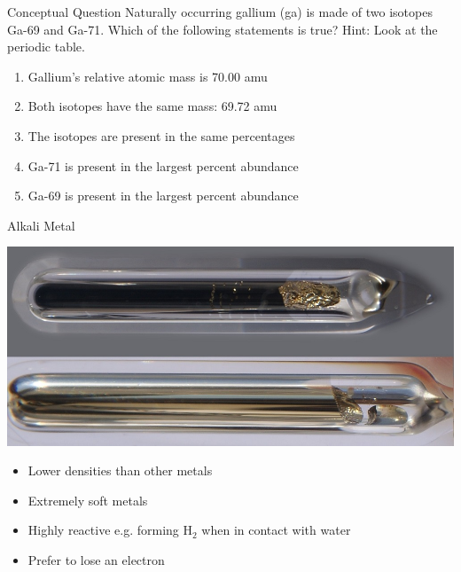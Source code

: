 \documentclass[11pt]{beamer}
\begin{document}
\begin{frame}{Conceptual Question}
  Naturally occurring gallium (ga) is made of two isotopes
  Ga-69 and Ga-71. Which of the following statements is true?
  Hint: Look at the periodic table.
  
  \begin{enumerate}
  \item Gallium's relative atomic mass is 70.00 amu
  \item Both isotopes have the same mass: 69.72 amu
  \item The isotopes are present in the same percentages
  \item Ga-71 is present in the largest percent abundance
  \item Ga-69 is present in the largest percent abundance
  \end{enumerate}
\end{frame}

\begin{frame}{Alkali Metal}
  \begin{center}
    \includegraphics[scale=0.2]{alkali_metal}
  \end{center}
  
  \begin{itemize}
  \item Lower densities than other metals
  \item Extremely soft metals
  \item Highly reactive e.g. forming H$_2$ when in
    contact with water
  \item Prefer to lose an electron
  \end{itemize}
\end{frame}
\end{document}
